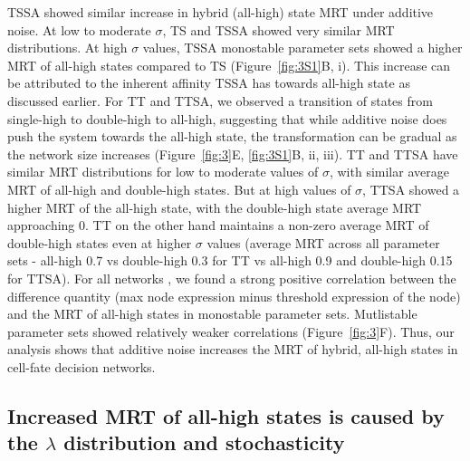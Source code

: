\documentclass[11pt]{article}
\begin{document}
TSSA showed similar increase in hybrid (all-high) state MRT under additive noise. At low to moderate $\sigma$, TS and TSSA showed very similar MRT distributions. At high $\sigma$ values, TSSA monostable parameter sets showed a higher MRT of all-high states compared to TS (Figure~\ref{fig:3S1}B, i). This increase can be attributed to the inherent affinity TSSA has towards all-high state as discussed earlier. For TT and TTSA, we observed a transition of states from single-high to double-high to all-high, suggesting that while additive noise does push the system towards the all-high state, the transformation can be gradual as the network size increases (Figure~\ref{fig:3}E, \ref{fig:3S1}B, ii, iii). TT and TTSA have similar MRT distributions for low to moderate values of $\sigma$, with similar average MRT of all-high and double-high states. But at high values of $\sigma$, TTSA showed a higher MRT of the all-high state, with the double-high state average MRT approaching 0. TT on the other hand maintains a non-zero average MRT of double-high states even at higher $\sigma$ values (average MRT across all parameter sets - all-high 0.7 vs double-high 0.3 for TT vs all-high 0.9 and double-high 0.15 for TTSA). For all networks , we found a strong positive correlation between the difference quantity (max node expression minus threshold expression of the node) and the MRT of all-high states in monostable parameter sets. Mutlistable parameter sets showed relatively weaker correlations (Figure~\ref{fig:3}F). Thus, our analysis shows that additive noise increases the MRT of hybrid, all-high states in cell-fate decision networks. 

\subsection{Increased MRT of all-high states is caused by the $\lambda$ distribution and stochasticity}
\end{document}
